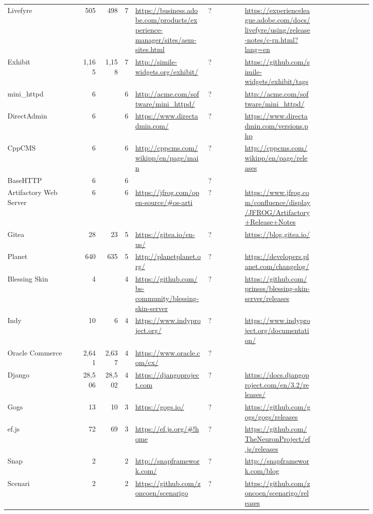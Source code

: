 \begin{longtable}{|p{0.2\linewidth}|r|r|r|p{0.2\linewidth}|p{0.1\linewidth}|p{0.2\linewidth}|p{0.15\linewidth}|}
	Livefyre &505 &498 &7 &\url{https://business.adobe.com/products/experience-manager/sites/aem-sites.html} &? &\url{https://experienceleague.adobe.com/docs/livefyre/using/release-notes/c-rn.html?lang=en} \\
	Exhibit &1,165 &1,158 &7 &\url{http://simile-widgets.org/exhibit/} &? &\url{https://github.com/simile-widgets/exhibit/tags} \\
	mini\_httpd &6 & &6 &\url{http://acme.com/software/mini\_httpd/} &? &\url{http://acme.com/software/mini\_httpd/} \\
	DirectAdmin &6 & &6 &\url{https://www.directadmin.com/} &? &\url{https://www.directadmin.com/versions.php} \\
	CppCMS &6 & &6 &\url{http://cppcms.com/wikipp/en/page/main} &? &\url{http://cppcms.com/wikipp/en/page/releases} \\
	BaseHTTP &6 & &6 & &? & \\
	Artifactory Web Server &6 & &6 &\url{https://jfrog.com/open-source/\#os-arti} &? &\url{https://www.jfrog.com/confluence/display/JFROG/Artifactory+Release+Notes} \\
	Gitea &28 &23 &5 &\url{https://gitea.io/en-us/} &? &\url{https://blog.gitea.io/} \\
	Planet &640 &635 &5 &\url{http://planetplanet.org/} &? &\url{https://developers.planet.com/changelog/} \\
	Blessing Skin &4 & &4 &\url{https://github.com/bs-community/blessing-skin-server} &? &\url{https://github.com/prinsss/blessing-skin-server/releases} \\
	Indy &10 &6 &4 &\url{https://www.indyproject.org/} &? &\url{https://www.indyproject.org/documentation/} \\
	Oracle Commerce &2,641 &2,637 &4 &\url{https://www.oracle.com/cx/} &? & \\
	Django &28,506 &28,502 &4 &\url{https://djangoproject.com} &? &\url{https://docs.djangoproject.com/en/3.2/releases/} \\
	Gogs &13 &10 &3 &\url{https://gogs.io/} &? &\url{https://github.com/gogs/gogs/releases} \\
	ef.js &72 &69 &3 &\url{https://ef.js.org/\#!home} &? &\url{https://github.com/TheNeuronProject/ef.js/releases} \\
	Snap &2 & &2 &\url{http://snapframework.com/} &? &\url{http://snapframework.com/blog} \\
	Scenari &2 & &2 &\url{https://github.com/zoncoen/scenarigo} &? &\url{https://github.com/zoncoen/scenarigo/releases} \\

\end{longtable}
